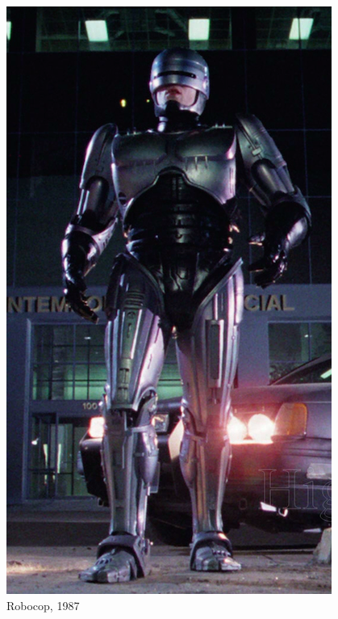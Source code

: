 \documentclass{beamer}
\begin{document}
\begin{frame}
\begin{figure}[h!]
\begin{minipage}[H]{0.20\linewidth}
				\includegraphics[width=\linewidth]{presentation_images/2}
				\caption{Robocop, 1987}
			\end{minipage}
			\hfill
			\begin{minipage}[H]{0.20\linewidth}

\end{minipage}
\end{figure}
\end{frame}
\end{document}
